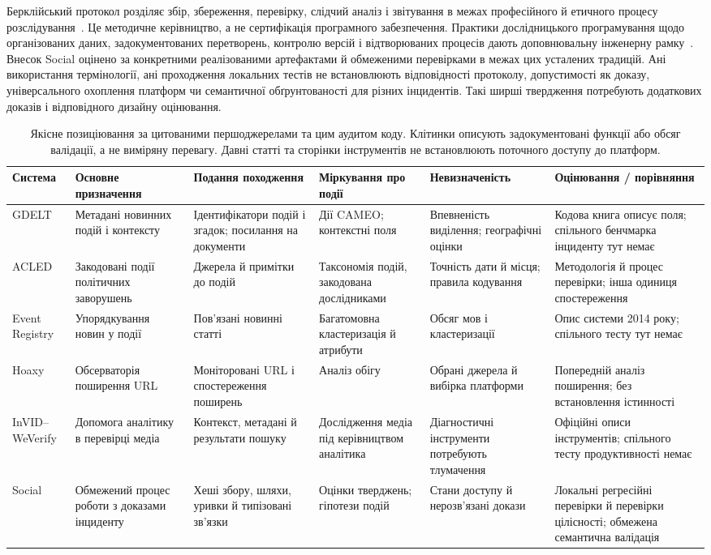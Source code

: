Берклійський протокол розділяє збір, збереження, перевірку, слідчий аналіз і звітування в межах професійного й етичного процесу розслідування~\cite{berkeleyProtocol2022}. Це методичне керівництво, а не сертифікація програмного забезпечення. Практики дослідницького програмування щодо організованих даних, задокументованих перетворень, контролю версій і відтворюваних процесів дають доповнювальну інженерну рамку~\cite{wilson2017practices}. Внесок Social оцінено за конкретними реалізованими артефактами й обмеженими перевірками в межах цих усталених традицій. Ані використання термінології, ані проходження локальних тестів не встановлюють відповідності протоколу, допустимості як доказу, універсального охоплення платформ чи семантичної обґрунтованості для різних інцидентів. Такі ширші твердження потребують додаткових доказів і відповідного дизайну оцінювання.

\begin{table}[!htbp]
\centering
\footnotesize
\setlength{\tabcolsep}{3pt}
\renewcommand{\arraystretch}{1.12}
\caption{Якісне позиціювання за цитованими першоджерелами та цим аудитом коду. Клітинки описують задокументовані функції або обсяг валідації, а не виміряну перевагу. Давні статті та сторінки інструментів не встановлюють поточного доступу до платформ.}
\label{tab:related}
\begin{tabularx}{\textwidth}{@{}p{20mm}YYYYY@{}}
\toprule
Система & Основне призначення & Подання походження & Міркування про події & Невизначеність & Оцінювання / порівняння \\
\midrule
GDELT & Метадані новинних подій і контексту & Ідентифікатори подій і згадок; посилання на документи & Дії CAMEO; контекстні поля & Впевненість виділення; географічні оцінки & Кодова книга описує поля; спільного бенчмарка інциденту тут немає \\
ACLED & Закодовані події політичних заворушень & Джерела й примітки до подій & Таксономія подій, закодована дослідниками & Точність дати й місця; правила кодування & Методологія й процес перевірки; інша одиниця спостереження \\
Event Registry & Упорядкування новин у події & Пов'язані новинні статті & Багатомовна кластеризація й атрибути & Обсяг мов і кластеризації & Опис системи 2014 року; спільного тесту тут немає \\
Hoaxy & Обсерваторія поширення URL & Моніторовані URL і спостереження поширень & Аналіз обігу & Обрані джерела й вибірка платформи & Попередній аналіз поширення; без встановлення істинності \\
InVID--WeVerify & Допомога аналітику в перевірці медіа & Контекст, метадані й результати пошуку & Дослідження медіа під керівництвом аналітика & Діагностичні інструменти потребують тлумачення & Офіційні описи інструментів; спільного тесту продуктивності немає \\
Social & Обмежений процес роботи з доказами інциденту & Хеші збору, шляхи, уривки й типізовані зв'язки & Оцінки тверджень; гіпотези подій & Стани доступу й нерозв'язані докази & Локальні регресійні перевірки й перевірки цілісності; обмежена семантична валідація \\
\bottomrule
\end{tabularx}
\end{table}
